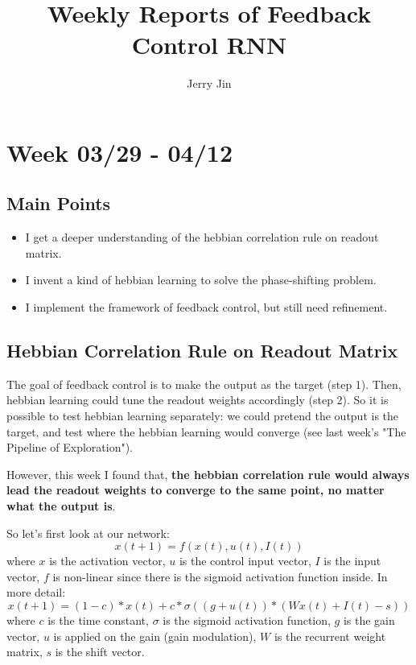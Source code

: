 \documentclass[12pt, a4paper]{article}
\title{Weekly Reports of Feedback Control RNN}
\author{Jerry Jin}
\begin{document}
\maketitle

\section*{Week 03/29 - 04/12}

\subsection*{Main Points}

\noindent
\begin{itemize}
    \item I get a deeper understanding of the hebbian correlation rule on readout matrix.
    \item I invent a kind of hebbian learning to solve the phase-shifting problem.
    \item I implement the framework of feedback control, but still need refinement.

\end{itemize}

\newpage

\subsection*{Hebbian Correlation Rule on Readout Matrix}

The goal of feedback control is to make the output as the target (step 1). Then, hebbian learning could tune the readout weights accordingly (step 2). So it is possible to test hebbian learning separately: we could pretend the output is the target, and test where the hebbian learning would converge (see last week's "The Pipeline of Exploration").

However, this week I found that, \textbf{the hebbian correlation rule would always lead the readout weights to converge to the same point, no matter what the output is}.

So let's first look at our network:
$$x(t+1) = f(x(t), u(t), I(t))$$
where $x$ is the activation vector, $u$ is the control input vector, $I$ is the input vector, $f$ is non-linear since there is the sigmoid activation function inside. In more detail:
$$x(t+1) = (1-c)*x(t) + c*\sigma((g+u(t)) * (Wx(t) + I(t) - s))$$
where $c$ is the time constant, $\sigma$ is the sigmoid activation function, $g$ is the gain vector, $u$ is applied on the gain (gain modulation), $W$ is the recurrent weight matrix, $s$ is the shift vector.
\end{document}
